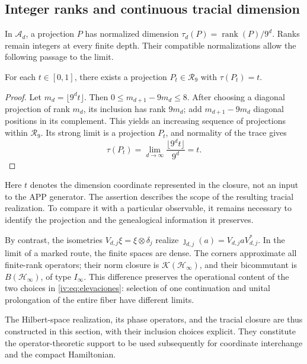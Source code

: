 \subsection{Integer ranks and continuous tracial dimension}

In \(\mathcal A_d\), a projection \(P\) has normalized
dimension \(\tau_d(P)=\operatorname{rank}(P)/9^d\).
Ranks remain integers at every finite depth. Their
compatible normalizations allow the following passage to the limit.

\begin{proposition}
\label{iv:prop:dimension-tracial}
For each \(t\in[0,1]\), there exists a projection
\(P_t\in\mathcal R_9\) with \(\tau(P_t)=t\).
\end{proposition}
\begin{proof}
Let \(m_d=\lfloor9^dt\rfloor\). Then
\(0\leq m_{d+1}-9m_d\leq8\). After choosing a diagonal projection
of rank \(m_d\), its inclusion has rank \(9m_d\);
add \(m_{d+1}-9m_d\) diagonal positions in its complement.
This yields an increasing sequence of projections within
\(\mathcal R_9\). Its strong limit is a projection \(P_t\),
and normality of the trace gives
\[
 \tau(P_t)=\lim_{d\to\infty}\frac{\lfloor9^dt\rfloor}{9^d}=t.
\]
\end{proof}

Here \(t\) denotes the dimension coordinate represented
in the closure, not an input to the APP generator. The assertion
describes the scope of the resulting tracial realization. To
compare it with a particular observable, it remains necessary to
identify the projection and the genealogical information it preserves.

By contrast, the isometries
\(V_{d,j}\xi=\xi\otimes\delta_j\) realize
\(\jmath_{d,j}(a)=V_{d,j}aV_{d,j}^*\). In the limit of a
marked route, the finite spaces are dense. The corners
approximate all finite-rank operators; their norm closure
is \(\mathcal K(\mathcal H_\infty)\), and their bicommutant is
\(B(\mathcal H_\infty)\), of type \(I_\infty\). This
difference preserves the operational content of the two choices
in \eqref{iv:eq:elevaciones}: selection of one continuation and
unital prolongation of the entire fiber have different limits.

The Hilbert-space realization, its phase operators, and the tracial
closure are thus constructed in this section, with their inclusion
choices explicit. They constitute the
operator-theoretic support to be used subsequently for coordinate
interchange and the compact Hamiltonian.
\par\endgroup
